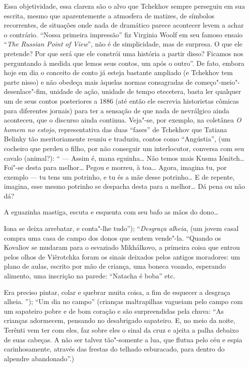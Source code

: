 Essa objetividade, essa clareza são o alvo que Tchekhov sempre perseguiu
em sua escrita, mesmo que aparentemente a atmosfera de matizes, de
símbolos recorrentes, de situações onde nada de dramático parece
acontecer levem a achar o contrário. ``Nossa primeira impressão'' fiz
Virginia Woolf em seu famoso ensaio ``\emph{The Russian Point of
View}'', não é de simplicidade, mas de surpresa. O que ele pretende? Por
que será que ele constrói uma história a partir disso? Ficamos nos
perguntando à medida que lemos seus contos, um após o outro''. De fato,
embora hoje em dia o conceito de conto já esteja bastante ampliado (e
Tchekhov tem parte nisso) e não obedeça mais àquelas normas consagradas
de começo"-meio"-desenlace"-fim, unidade de ação, unidade de tempo
etecetera, basta ler qualquer um de seus contos posteriores a 1886 (até
então ele escrevia historietas cômicas para diferentes jornais) para ter
a sensação de que nada de nevrálgico ainda aconteceu, que o discurso
ainda continua. Veja"-se, por exemplo, na coletânea \emph{O homem no
estojo}, representativa das duas ``fases'' de Tchekhov que Tatiana
Belinky tão meritoriamente reuniu e traduziu, contos como ``Angústia'',
(um cocheiro que perdeu o filho, por não conseguir um interlocutor,
conversa com seu cavalo (animal?): `` --- Assim é, mana eguinha\ldots{} Não
temos mais Kusma Iónitch\ldots{} Foi"-se desta para melhor\ldots{} Pegou e morreu,
à toa\ldots{} Agora, imagina tu, por exemplo --- tu tens um potrinho, e tu és
a mãe desse potrinho\ldots{} E de repente, imagina, esse mesmo potrinho se
despacha desta para a melhor\ldots{} Dá pena ou não dá?

A eguazinha mastiga, escuta e esquenta com seu bafo as mãos do dono\ldots{}

Iona se deixa arrebatar, e conta"-lhe tudo''); ``\emph{Desgraça alheia},
(um jovem casal compra uma casa de campo dos donos que sentem vende"-la.
``Quando os Kovaliov se mudaram para o esvaziado Mikhálkovo, a primeira
coisa que entrou pelos olhos de Viêrotchka foram os sinais deixados
pelos antigos moradores: um plano de aulas, escrito por mão de criança,
uma boneca voando, esperando alimento, uma inscrição na parede:
``Natacha é boba'' etc.

Era preciso pintar, colar e quebrar muita coisa, a fim de esquecer a
desgraça alheia. ''); ``Um dia no campo'' (crianças maltrapilhas
vagueiam pelo campo com um sapateiro pobre e de bom coração e são
surpreendidas pela chuva: ``As crianças adormecem, pensando no
desabrigado sapateiro. E, no meio da noite, Terênti vem ter com eles,
faz sobre eles o sinal da cruz e ajeita a palha debaixo de suas cabeças.
A não ser talvez tão"-somente a lua, que flutua pelo céu e espia
carinhosamente, através das frestas do telhado esburacado, para dentro
do alpendre abandonado''.)


